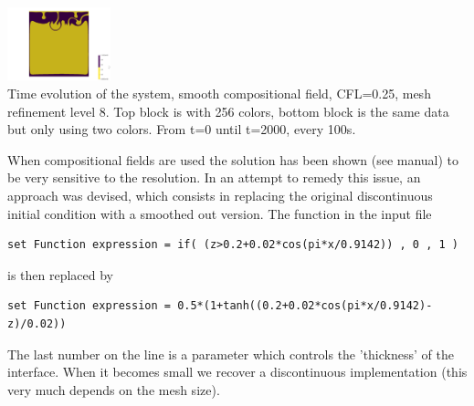 \begin{itemize}
\begin{center}
\includegraphics[width=3cm]{images/benchmark_vaks97/aspect/lvl7/composition_threshold0019}\\
{\captionfont Time evolution of the system, smooth compositional field, CFL=0.25, 
mesh refinement level 8. Top block is with 256 colors, bottom block is the same data 
but only using two colors. From t=0 until t=2000, every 100s.}
\end{center}

When compositional fields are used the solution has been shown (see \aspect manual)
to be very sensitive to the resolution. In an attempt to remedy this issue, 
an approach was devised, which consists in replacing the original discontinuous initial 
condition with a smoothed out version. The function in the input file 
\begin{lstlisting}
set Function expression = if( (z>0.2+0.02*cos(pi*x/0.9142)) , 0 , 1 )
\end{lstlisting}
is then replaced by 
\begin{lstlisting}
set Function expression = 0.5*(1+tanh((0.2+0.02*cos(pi*x/0.9142)-z)/0.02))
\end{lstlisting}
The last number on the line is a parameter which controls the 'thickness' of the interface.
When it becomes small we recover a discontinuous implementation (this very much 
depends on the mesh size). 



\end{itemize}
